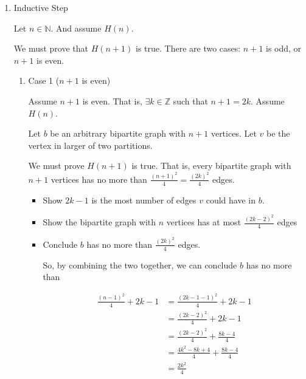 \documentclass[12pt]{article}
\begin{document}
\begin{enumerate}[a.]
\begin{mdframed}
\begin{enumerate}[1.]
            \item Inductive Step

            \bigskip

            Let $n \in \mathbb{N}$. And assume $H(n)$.

            \bigskip

            We must prove that $H(n+1)$ is true. There are two cases: $n+1$ is odd, or
            $n+1$ is even.

            \bigskip

            \begin{enumerate}[1.]
                \item Case 1 ($n+1$ is even)

                \bigskip

                Assume $n+1$ is even. That is, $\exists k \in \mathbb{Z}$ such that
                $n+1 = 2k$. Assume $H(n)$.

                \bigskip

                Let $b$ be an arbitrary bipartite graph with $n+1$ vertices. Let
                $v$ be the vertex in larger of two partitions.

                \bigskip

                We must prove $H(n+1)$ is true. That is, every bipartite graph
                with $n+1$ vertices has no more than $\frac{(n+1)^2}{4} = \frac{(2k)^2}{4}$
                edges.

                \bigskip

                \begin{itemize}
                    \item Show $2k-1$ is the most number of edges $v$ could have
                    in $b$.

                    \item Show the bipartite graph with $n$ vertices has
                    at most $\frac{(2k-2)^2}{4}$ edges

                    \item Conclude $b$ has no more than $\frac{(2k)^2}{4}$ edges.

                    \begin{mdframed}
                    So, by combining the two together, we can conclude $b$ has no more than

                    \begin{align}
                        \frac{(n-1)^2}{4} + 2k - 1 &= \frac{(2k-1-1)^2}{4} + 2k - 1\\
                        &= \frac{(2k-2)^2}{4} + 2k - 1\\
                        &= \frac{(2k-2)^2}{4} + \frac{8k - 4}{4}\\
                        &= \frac{4k^2 - 8k + 4}{4} + \frac{8k - 4}{4}\\
                        &= \frac{2k^2}{4}
                    \end{align}


\end{mdframed}
\end{itemize}
\end{enumerate}
\end{enumerate}
\end{mdframed}
\end{enumerate}
\end{document}
